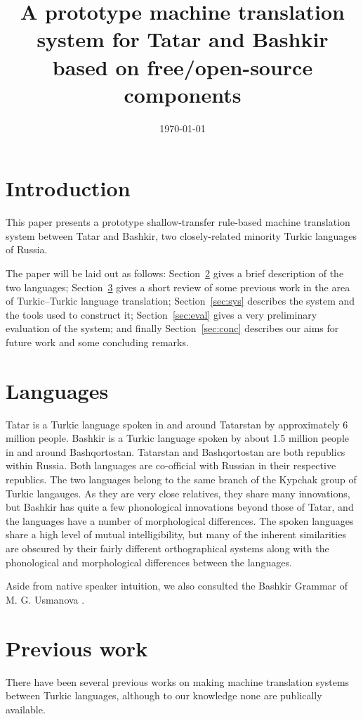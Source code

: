 \documentclass[11pt,a4paper]{article}
\title{A prototype machine translation system for Tatar and Bashkir based on 
   free/open-source components}
\date{\today}
\begin{document}
\maketitleabstract

\section{Introduction}

This paper presents a prototype shallow-transfer rule-based machine translation
system between Tatar and Bashkir, two closely-related minority Turkic 
languages of Russia. 

The paper will be laid out as follows: Section~\ref{sec:lang} gives a brief description
of the two languages; Section~\ref{sec:prev} gives a short review of some previous
work in the area of Turkic--Turkic language translation; Section~\ref{sec:sys} 
describes the system and the tools used to construct it; Section~\ref{sec:eval}
gives a very preliminary evaluation of the system; and finally Section~\ref{sec:conc}
describes our aims for future work and some concluding remarks.

\section{Languages}
\label{sec:lang}

Tatar is a Turkic language spoken in and around Tatarstan by approximately 6 million people.  Bashkir is
a Turkic language spoken by about 1.5 million people in and around Bashqortostan.  Tatarstan 
and Bashqortostan are both republics within Russia.  Both languages are co-official with Russian 
in their respective republics. The two languages belong to the same branch of the Kypchak group 
of Turkic langauges.  As they are very close relatives, they share many innovations, but Bashkir 
has quite a few phonological innovations beyond those of Tatar, and the languages have a number 
of morphological differences.  The spoken languages share a high level of mutual intelligibility, 
but many of the inherent similarities are obscured by their fairly different orthographical 
systems along with the phonological and morphological differences between the languages.

Aside from native speaker intuition, we also consulted the Bashkir Grammar of M. G. Usmanova \cite{usmanova06}.

\section{Previous work}
\label{sec:prev}

There have been several previous works on making machine translation systems between 
Turkic languages, although to our knowledge none are publically available. 
\end{document}

